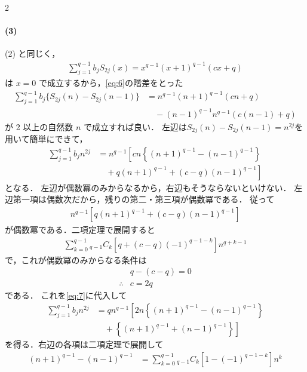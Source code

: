 \documentclass[../../main.tex]{subfiles}
\begin{document}
\begin{multicols}{2}
  \paragraph{(3)}
  (2) と同じく，
  \begin{align}
    \sum_{j=1}^{q-1} b_{j} S_{2j}(x) = x^{q-1}(x+1)^{q-1}(cx+q) \label{eq:6}
  \end{align}
  は $x=0$ で成立するから，\cref{eq:6}の階差をとった
  \begin{align}
    \sum_{j=1}^{q-1} b_{j} \{ S_{2j}(n) - S_{2j}(n-1) \}
    & = n^{q-1}(n+1)^{q-1}(cn+q)           \\
    & \quad - (n-1)^{q-1}n^{q-1}(c(n-1)+q)
  \end{align}
  が 2 以上の自然数 $n$ で成立すれば良い．
  左辺は$S_{2j}(n) - S_{2j}(n-1) = n^{2j}$を用いて簡単にできて，
  \begin{align}
    \sum_{j=1}^{q-1} b_{j} n^{2j}
    & = n^{q-1} \left[ cn\left\{(n+1)^{q-1} - (n-1)^{q-1} \right\}\right.       \\
    & \quad + \left.q(n+1)^{q-1} + (c-q) (n-1)^{q-1} \right]\label{eq:7}
  \end{align}
  となる．
  左辺が偶数冪のみからなるから，右辺もそうならないといけない．
  左辺第一項は偶数次だから，残りの第二・第三項が偶数冪である．
  従って
  \begin{align}
    n^{q-1}\left[q(n+1)^{q-1} + (c-q) (n-1)^{q-1}\right]
  \end{align}
  が偶数冪である．二項定理で展開すると
  \begin{align}
    \sum_{k=0}^{q-1}{}_{q-1}C_k\left[q + (c-q)(-1)^{q-1-k}\right]n^{q+k-1}
  \end{align}
  で，これが偶数冪のみからなる条件は
  \begin{align}
    & q - (c-q) = 0              \\
    \therefore
    & c = 2q \label{eq:8}
  \end{align}
  である．
  これを\cref{eq:7}に代入して
  \begin{align}
    \sum_{j=1}^{q-1} b_{j} n^{2j}
    & = qn^{q-1} \left[ 2n\left\{(n+1)^{q-1} - (n-1)^{q-1} \right\}\right.    \nonumber  \\
    & \quad + \left.\left\{(n+1)^{q-1} + (n-1)^{q-1}\right\} \right] \label{eq:9}
  \end{align}
  を得る．右辺の各項は二項定理で展開して
  \begin{align}
    (n+1)^{q-1} - (n-1)^{q-1}
    & = \sum_{k=0}^{q-1} {}_{q-1}C_{k} \left[1-(-1)^{q-1-k}\right]n^{k}   \\

\end{align}
\end{multicols}
\end{document}
